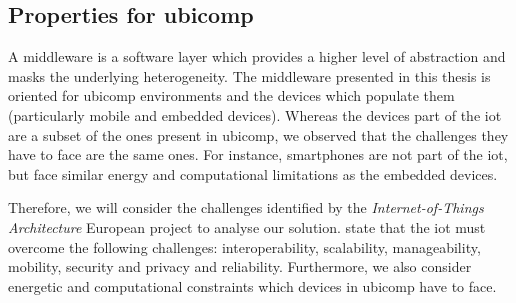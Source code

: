 


\subsection{Properties for \acs{ubicomp}}
\label{sec:middleware_properties}

A middleware is a software layer which provides a higher level of abstraction and masks the underlying heterogeneity.
The middleware presented in this thesis is oriented for \ac{ubicomp} environments and the devices which populate them (particularly mobile and embedded devices).
Whereas the devices part of the \ac{iot} are a subset of the ones present in \ac{ubicomp}, we observed that the challenges they have to face are the same ones.
For instance, smartphones are not part of the \ac{iot}, but face similar energy and computational limitations as the embedded devices. %

Therefore, we will consider the challenges identified by the \emph{Internet-of-Things Architecture} European project \citep{walewski_project_2011} to analyse our solution.
\citeauthor{walewski_project_2011} state that the \ac{iot} must overcome the following challenges:
interoperability, scalability, manageability, mobility, security and privacy and reliability.
Furthermore, we also consider energetic and computational constraints which devices in \ac{ubicomp} have to face. %


